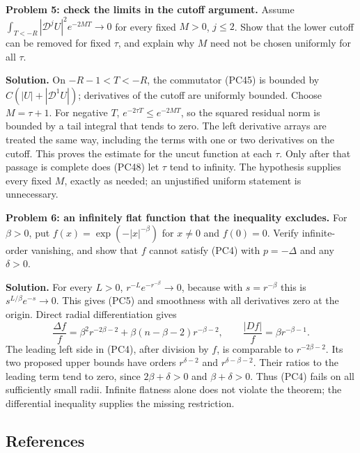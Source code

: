 \documentclass[
  11pt,
]{article}
\makeatletter
\let\ReaderOriginalAnchorStart\hyper@anchorstart
\let\ReaderOriginalAnchorEnd\hyper@anchorend
\let\ReaderPendingAliases\@empty
\def\ReaderArmAliases#1{\gdef\ReaderPendingAliases{#1}}
\def\hyper@anchorstart#1{\ReaderIfNativeAnchorTF{#1}{\ReaderPendingAliases\global\let\ReaderPendingAliases\@empty}{}\ReaderOriginalAnchorStart{#1}}
\makeatother
\begin{document}
\textbf{Problem 5: check the limits in the cutoff argument.} Assume
\(\int_{T<-R}|\mathscr D^jU|^2e^{-2MT}\to0\) for every fixed \(M>0\),
\(j\leq2\). Show that the lower cutoff can be removed for fixed
\(\tau\), and explain why \(M\) need not be chosen uniformly for all
\(\tau\).

\textbf{Solution.} On \(-R-1<T<-R\), the commutator (PC45) is bounded by
\(C(|U|+|\mathscr D^1U|)\); derivatives of the cutoff are uniformly
bounded. Choose \(M=\tau+1\). For negative \(T\),
\(e^{-2\tau T}\leq e^{-2MT}\), so the squared residual norm is bounded
by a tail integral that tends to zero. The left derivative arrays are
treated the same way, including the terms with one or two derivatives on
the cutoff. This proves the estimate for the uncut function at each
\(\tau\). Only after that passage is complete does (PC48) let \(\tau\)
tend to infinity. The hypothesis supplies every fixed \(M\), exactly as
needed; an unjustified uniform statement is unnecessary.

\textbf{Problem 6: an infinitely flat function that the inequality
excludes.} For \(\beta>0\), put \(f(x)=\exp(-|x|^{-\beta})\) for
\(x\ne0\) and \(f(0)=0\). Verify infinite-order vanishing, and show that
\(f\) cannot satisfy (PC4) with \(p=-\Delta\) and any \(\delta>0\).

\textbf{Solution.} For every \(L>0\), \(r^{-L}e^{-r^{-\beta}}\to0\),
because with \(s=r^{-\beta}\) this is \(s^{L/\beta}e^{-s}\to0\). This
gives (PC5) and smoothness with all derivatives zero at the origin.
Direct radial differentiation gives \[
\frac{\Delta f}{f}
=\beta^2r^{-2\beta-2}+\beta(n-\beta-2)r^{-\beta-2},
\qquad \frac{|Df|}{f}=\beta r^{-\beta-1}.
\tag{PC51}
\] The leading left side in (PC4), after division by \(f\), is
comparable to \(r^{-2\beta-2}\). Its two proposed upper bounds have
orders \(r^{\delta-2}\) and \(r^{\delta-\beta-2}\). Their ratios to the
leading term tend to zero, since \(2\beta+\delta>0\) and
\(\beta+\delta>0\). Thus (PC4) fails on all sufficiently small radii.
Infinite flatness alone does not violate the theorem; the differential
inequality supplies the missing restriction.

\ReaderArmAliases{\ReaderOriginalAnchorStart{reading-and-further-work}\ReaderOriginalAnchorEnd\begingroup\expandafter\def\csname @currentHref\endcsname{reading-and-further-work}\label{reading-and-further-work}\endgroup\ReaderOriginalAnchorStart{references}\ReaderOriginalAnchorEnd}
\subsection{References}\label{references}
\end{document}
